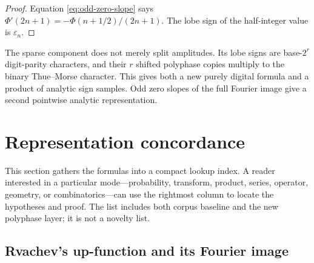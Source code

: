 \documentclass[11pt,oneside]{article}
\numberwithin{equation}{section}
\theoremstyle{definition}
\theoremstyle{remark}
\newcommand{\eps}{\varepsilon}
\begin{document}
\begin{proof}
Equation \eqref{eq:odd-zero-slope} says
$\Phi'(2n+1)=-\Phi(n+1/2)/(2n+1)$.  The lobe sign of the half-integer value is
$\eps_n$.
\end{proof}

\begin{resultbox}
The sparse component does not merely split amplitudes.  Its lobe signs are
base-$2^r$ digit-parity characters, and their $r$ shifted polyphase copies
multiply to the binary Thue--Morse character.  This gives both a new purely
digital formula and a product of analytic sign samples.  Odd zero slopes of the
full Fourier image give a second pointwise analytic representation.
\end{resultbox}

\section{Representation concordance}
\label{sec:concordance}

This section gathers the formulas into a compact lookup index.  A reader
interested in a particular mode---probability, transform, product, series,
operator, geometry, or combinatorics---can use the rightmost column to locate
the hypotheses and proof.  The list includes both corpus baseline and the new
polyphase layer; it is not a novelty list.

\subsection{Rvachev's up-function and its Fourier image}
\end{document}
